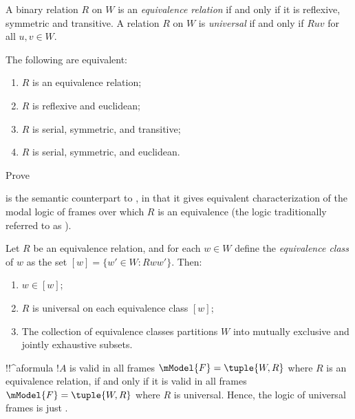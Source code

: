 \documentclass[../../../include/open-logic-section]{subfiles}
\begin{document}


\begin{defn}
  A binary relation $R$ on $W$ is an \emph{equivalence relation} if
  and only if it is reflexive, symmetric and transitive.  A relation
  $R$ on $W$ is \emph{universal} if and only if $Ruv$ for all $u,v \in
  W$.
\end{defn}

\begin{prop}
  The following are equivalent:
  \begin{enumerate}
  \item $R$ is an equivalence relation;
  \item $R$ is reflexive and euclidean;
  \item $R$ is serial, symmetric, and transitive;
  \item $R$ is serial, symmetric, and euclidean. 
  \end{enumerate}
\end{prop}

\begin{prob}
  Prove 
\end{prob}

 is the semantic counterpart to
, in that it gives equivalent characterization of
the modal logic of frames over which $R$ is an equivalence (the logic
traditionally referred to as ).

\begin{prop}
  Let $R$ be an equivalence relation, and for each $w \in W$ define
  the \emph{equivalence class} of $w$ as the set $[w] = \{w'\in W :
  Rww'\}$. Then:
  \begin{enumerate}
  \item $w \in [w]$;
  \item $R$ is universal on each equivalence class $[w]$;
  \item The collection of equivalence classes partitions $W$ into mutually
    exclusive and jointly exhaustive subsets.
  \end{enumerate}
\end{prop}

\begin{prop}
  !!^a{formula} $!A$ is valid in all frames $\mModel{F} =\tuple{W,R}$
  where $R$ is an equivalence relation, if and only if it is valid in
  all frames $\mModel{F} =\tuple{W,R}$ where $R$ is universal. Hence,
  the logic of universal frames is just .
\end{prop}
\end{document}
